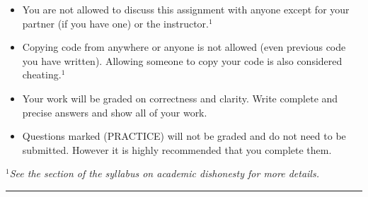 \documentclass[11pt,answers]{exam}
\begin{document}
\begin{itemize}
\item You are not allowed to discuss this assignment with anyone except for your partner (if you have one) or the instructor.$^1$
\item Copying code from anywhere or anyone is not allowed (even previous code you have written).  Allowing someone to copy your code is also considered cheating.$^1$
\item Your work will be graded on correctness and clarity.  Write complete and precise answers and show all of your work.  
\item Questions marked (PRACTICE) will not be graded and do not need to be submitted. However it is highly recommended that you complete them.
\end{itemize}
\emph{$^1$See the section of the syllabus on academic dishonesty for more details.}\\
\hrule
\vspace{2em}
\\ 
\end{document}
